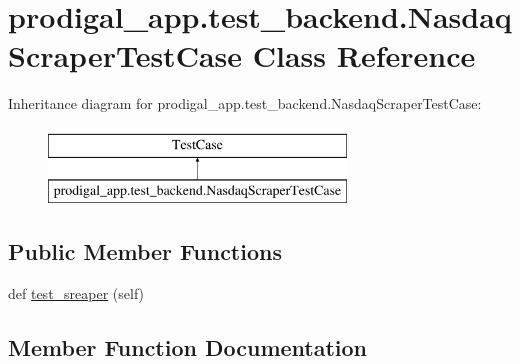 \hypertarget{classprodigal__app_1_1test__backend_1_1_nasdaq_scraper_test_case}{}\section{prodigal\+\_\+app.\+test\+\_\+backend.\+Nasdaq\+Scraper\+Test\+Case Class Reference}
\label{classprodigal__app_1_1test__backend_1_1_nasdaq_scraper_test_case}
Inheritance diagram for prodigal\+\_\+app.\+test\+\_\+backend.\+Nasdaq\+Scraper\+Test\+Case\+:\begin{figure}[H]
\begin{center}
\leavevmode
\includegraphics[height=2.000000cm]{classprodigal__app_1_1test__backend_1_1_nasdaq_scraper_test_case}
\end{center}
\end{figure}
\subsection*{Public Member Functions}
\begin{DoxyCompactItemize}
\item 
def \mbox{\hyperlink{classprodigal__app_1_1test__backend_1_1_nasdaq_scraper_test_case_a61c81f648072f50da49b9eb6508474f7}{test\+\_\+sreaper}} (self)
\end{DoxyCompactItemize}


\subsection{Member Function Documentation}
\mbox{\label{classprodigal__app_1_1test__backend_1_1_nasdaq_scraper_test_case_a61c81f648072f50da49b9eb6508474f7}} 
